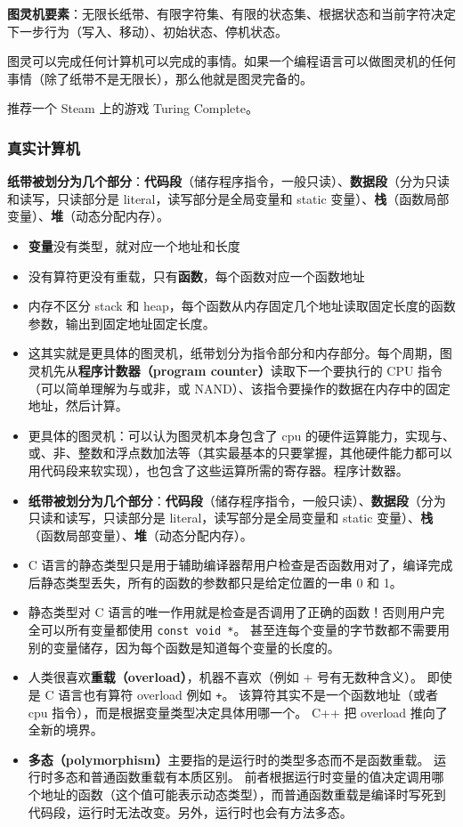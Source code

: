 

\textbf{图灵机要素}：无限长纸带、有限字符集、有限的状态集、根据状态和当前字符决定下一步行为（写入、移动）、初始状态、停机状态。

图灵可以完成任何计算机可以完成的事情。如果一个编程语言可以做图灵机的任何事情（除了纸带不是无限长），那么他就是图灵完备的。

推荐一个 Steam 上的游戏 Turing Complete。

\subsubsection{真实计算机}
\textbf{纸带被划分为几个部分}：\textbf{代码段}（储存程序指令，一般只读）、\textbf{数据段}（分为只读和读写，只读部分是 literal，读写部分是全局变量和 static 变量）、\textbf{栈}（函数局部变量）、\textbf{堆}（动态分配内存）。

\begin{itemize}
\item \textbf{变量}没有类型，就对应一个地址和长度
\item 没有算符更没有重载，只有\textbf{函数}，每个函数对应一个函数地址
\item 内存不区分 stack 和 heap，每个函数从内存固定几个地址读取固定长度的函数参数，输出到固定地址固定长度。
\item 这其实就是更具体的图灵机，纸带划分为指令部分和内存部分。每个周期，图灵机先从\textbf{程序计数器（program counter）}读取下一个要执行的 CPU 指令（可以简单理解为与或非，或 NAND）、该指令要操作的数据在内存中的固定地址，然后计算。
\item 更具体的图灵机：可以认为图灵机本身包含了 cpu 的硬件运算能力，实现与、或、非、整数和浮点数加法等（其实最基本的只要掌握，其他硬件能力都可以用代码段来软实现），也包含了这些运算所需的寄存器。程序计数器。
\item \textbf{纸带被划分为几个部分}：\textbf{代码段}（储存程序指令，一般只读）、\textbf{数据段}（分为只读和读写，只读部分是 literal，读写部分是全局变量和 static 变量）、\textbf{栈}（函数局部变量）、\textbf{堆}（动态分配内存）。
\item C 语言的静态类型只是用于辅助编译器帮用户检查是否函数用对了，编译完成后静态类型丢失，所有的函数的参数都只是给定位置的一串 0 和 1。
\item 静态类型对 C 语言的唯一作用就是检查是否调用了正确的函数！否则用户完全可以所有变量都使用 \verb`const void *`。 甚至连每个变量的字节数都不需要用别的变量储存，因为每个函数是知道每个变量的长度的。
\item 人类很喜欢\textbf{重载（overload）}，机器不喜欢（例如 + 号有无数种含义）。 即使是 C 语言也有算符 overload 例如 \verb`+`。 该算符其实不是一个函数地址（或者 cpu 指令），而是根据变量类型决定具体用哪一个。 C++ 把 overload 推向了全新的境界。
\item \textbf{多态（polymorphism）}主要指的是运行时的类型多态而不是函数重载。 运行时多态和普通函数重载有本质区别。 前者根据运行时变量的值决定调用哪个地址的函数（这个值可能表示动态类型），而普通函数重载是编译时写死到代码段，运行时无法改变。另外，运行时也会有方法多态。
\end{itemize}
